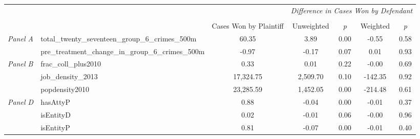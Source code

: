 \begin{tabular}{llccccc}
\toprule
 &  & \textit{} & \multicolumn{4}{c}{\textit{Difference in Cases Won by Defendant}} \\
\cline{4-7}
\\
 &  & Cases Won by Plaintiff & Unweighted & \emph{p} & Weighted & \emph{p} \\
\midrule
\multirow[c]{2}{3cm}{\textit{Panel A}} & total_twenty_seventeen_group_6_crimes_500m & 60.35 & 3.89 & 0.00 & -0.55 & 0.58 \\
 & pre_treatment_change_in_group_6_crimes_500m & -0.97 & -0.17 & 0.07 & 0.01 & 0.93 \\
\cline{1-7}
\multirow[c]{3}{3cm}{\textit{Panel B}} & frac_coll_plus2010 & 0.33 & 0.01 & 0.22 & -0.00 & 0.69 \\
 & job_density_2013 & 17,324.75 & 2,509.70 & 0.10 & -142.35 & 0.92 \\
 & popdensity2010 & 23,285.59 & 1,452.05 & 0.00 & -214.48 & 0.61 \\
\cline{1-7}
\multirow[c]{3}{3cm}{\textit{Panel D}} & hasAttyP & 0.88 & -0.04 & 0.00 & -0.01 & 0.37 \\
 & isEntityD & 0.02 & -0.01 & 0.06 & -0.00 & 0.96 \\
 & isEntityP & 0.81 & -0.07 & 0.00 & -0.01 & 0.40 \\
\cline{1-7}
\bottomrule
\end{tabular}
